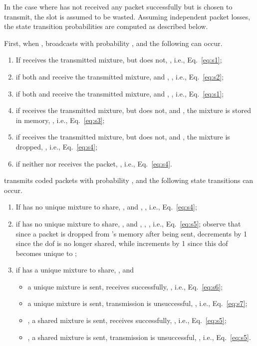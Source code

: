 \documentclass[journal, letterpaper]{IEEEtran}
\begin{document}
\begin{itemize}
In the case where  has not received any packet successfully but is chosen to transmit, the slot is assumed to be wasted. Assuming independent packet losses, the state transition probabilities are computed as described below.

First, when ,  broadcasts with probability , and the following can occur.

\begin{enumerate}
    \item If  receives the transmitted mixture, but  does not, , i.e., Eq.~\eqref{eq:s1};
    \item if both  and  receive the transmitted mixture, and , , i.e., Eq.~\eqref{eq:s2};
    \item if both  and  receive the transmitted mixture, and , , i.e., Eq.~\eqref{eq:s1};
    \item if  receives the transmitted mixture, but  does not, and , the mixture is stored in memory, , i.e., Eq.~\eqref{eq:s3};
    \item if  receives the transmitted mixture, but  does not, and , the mixture is dropped, , i.e., Eq.~\eqref{eq:s4};
    \item if neither  nor  receives the packet, , i.e., Eq.~\eqref{eq:s4}.
\end{enumerate}

\noindent  transmits coded packets with probability , and the following state transitions can occur.
\begin{enumerate}
    \item If  has no unique mixture to share, , and , , i.e., Eq.~\eqref{eq:s4};
    \item if  has no unique mixture to share, , and , , , i.e., Eq.~\eqref{eq:s5}; observe that since a packet is dropped from 's memory after being sent,  decrements by 1 since the dof is no longer shared, while  increments by 1 since this dof becomes unique to ;
    \item if  has a unique mixture to share, , and
        \begin{itemize}
        \item a unique mixture is sent,  receives successfully,
            , i.e., Eq.~\eqref{eq:s6};
        \item a unique mixture is sent, transmission is unsuccessful,
            , i.e., Eq.~\eqref{eq:s7};
        \item , a shared mixture is sent,  receives successfully,
            , i.e., Eq.~\eqref{eq:s5};
        \item , a shared mixture is sent, transmission is unsuccessful,
            , i.e., Eq.~\eqref{eq:s5}.
        \end{itemize}
\end{enumerate}


\end{itemize}
\end{document}
